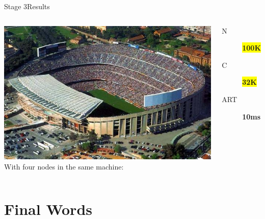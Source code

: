 \documentclass[utf8,hyperref={colorlinks=true}]{beamer}
\begin{document}
\begin{frame}{Stage 3}{Results}
	\begin{columns}
			\includegraphics[top=-1,width=\textwidth]{img/results-4.jpg}
			With four nodes in the same machine:
			\begin{description}
				\item[N] \textbf{\colorbox{yellow}{\Large 100K}}
				\item[C] \textbf{\colorbox{yellow}{\Large 32K}}
				\item[ART] \textbf{\Large 10ms}
			\end{description}
	\end{columns}
\end{frame}

\section{Final Words}
\end{document}
